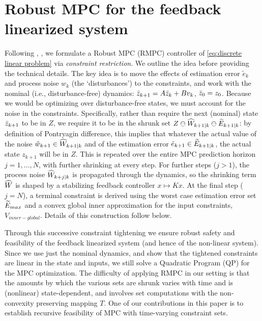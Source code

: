 \section{Robust MPC for the feedback linearized system}

Following \cite{RichardsH05_RMPC}, \cite{PantAMNDM15_Anytime}, we formulate a Robust MPC (RMPC) controller of \eqref{eq:discrete linear problem} via \emph{constraint restriction}.
We outline the idea before providing the technical details.
The key idea is to move the effects of estimation error $\tilde{e}_k$ and  process noise $w_k$ (the `disturbances') to the constraints, and work with the nominal  (i.e., disturbance-free) dynamics: $\bar{z}_{k+1} = A\bar{z}_{k}+Bv_k$, $\bar{z}_{0} = z_0$.
Because we would be optimizing over disturbance-free states, we must account for the noise in the constraints. 
Specifically, rather than require the next (nominal) state $\bar{z}_{k+1}$ to be in $Z$, we require it to be in the shrunk set $Z \ominus \widehat{W}_{k+1|k} \ominus \widetilde{E}_{k+1|k}$: by definition of Pontryagin difference, this implies that whatever the actual value of the noise $\hat{w}_{k+1} \in \widehat{W}_{k+1|k}$ and of the estimation error $\tilde{e}_{k+1} \in \widetilde{E}_{k+1|k}$, the actual state $z_{k+1}$ will be in $Z$. 
This is repeated over the entire MPC prediction horizon $j=1,\ldots,N$, with further shrinking at every step.
For further steps ($j>1$), the process noise $\widehat{W}_{k+j|k}$ is propagated through the dynamics, so the shrinking term $\widehat{W}$ is shaped by a stabilizing feedback controller $x \mapsto Kx$.
At the final step ($j=N$), a terminal constraint is derived using the worst case estimation error set $\widetilde{E}_{max}$ and a convex global inner approximation for the input constraints, $V_{inner-global}$. 
Details of this construction follow below.

Through this successive constraint tightening we ensure robust safety and feasibility of the feedback linearized system (and hence of the non-linear system). 
Since we use just the nominal dynamics, and show that the tightened constraints are linear in the state and inputs, we still solve a Quadratic Program (QP) for the MPC optimization.
The difficulty of applying RMPC in our setting is that the amounts by which the various sets are shrunk varies with time and is (nonlinear) state-dependent, and involves set computations with the non-convexity preserving mapping $T$.
One of our contributions in this paper is to establish recursive feasibility of MPC with time-varying constraint sets.

